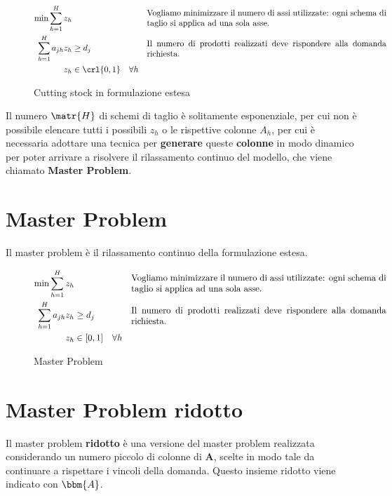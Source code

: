 \documentclass[\main/main.tex]{subfiles}
\begin{document}
\begin{figure}
    \begin{align*}
        \min \sum_{h=1}^H z_h & &&\parbox{10cm}{Vogliamo minimizzare il numero di assi utilizzate: ogni schema di taglio si applica ad una sola asse.}\\
        \sum_{h=1}^H a_{jh} z_h &\geq d_j && \parbox{10cm}{Il numero di prodotti realizzati deve rispondere alla domanda richiesta.}\\
        z_h &\in \crl{0,1} \quad \forall h
    \end{align*}
    \caption{Cutting stock in formulazione estesa}
\end{figure}

Il numero \(\matr{H}\) di schemi di taglio è solitamente esponenziale, per cui non è possibile elencare tutti i possibili \(z_h\) o le rispettive colonne \(A_h\), per cui è necessaria adottare una tecnica per \textbf{generare} queste \textbf{colonne} in modo dinamico per poter arrivare a risolvere il rilassamento continuo del modello, che viene chiamato \textbf{Master Problem}.

\section{Master Problem}
Il master problem è il rilassamento continuo della formulazione estesa.
\begin{figure}
    \begin{align*}
        \min \sum_{h=1}^H z_h & &&\parbox{10cm}{Vogliamo minimizzare il numero di assi utilizzate: ogni schema di taglio si applica ad una sola asse.}\\
        \sum_{h=1}^H a_{jh} z_h &\geq d_j && \parbox{10cm}{Il numero di prodotti realizzati deve rispondere alla domanda richiesta.}\\
        z_h &\in [0,1] \quad \forall h
    \end{align*}
    \caption{Master Problem}
\end{figure}

\section{Master Problem ridotto}
Il master problem \textbf{ridotto} è una versione del master problem realizzata considerando un numero piccolo di colonne di \(\bm{A}\), scelte in modo tale da continuare a rispettare i vincoli della domanda. Questo insieme ridotto viene indicato con \(\bbm{A}\).
\end{document}
